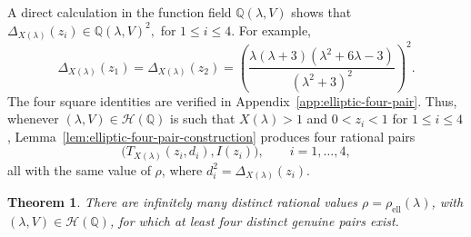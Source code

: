 \documentclass[11pt]{amsart}
\theoremstyle{plain}
\newtheorem{thm}{Theorem}[section]
\theoremstyle{remark}
\theoremstyle{plain}
\newcommand{\Q}{\mathbb{Q}}
\begin{document}
A direct calculation in the function field
$\Q(\lambda,V)$
shows that
$\Delta_{X(\lambda)}(z_i)\in\Q(\lambda,V)^2,$
for $1\leq i\leq4$.
For example,
\[
\Delta_{X(\lambda)}(z_1)
=
\Delta_{X(\lambda)}(z_2)
=
\left(
\frac{\lambda(\lambda+3)(\lambda^2+6\lambda-3)}
     {(\lambda^2+3)^2}
\right)^2.
\]
The four square identities are verified in
Appendix~\ref{app:elliptic-four-pair}. Thus, whenever $(\lambda,V)\in \mathcal H(\Q)$ is such that $X(\lambda)>1$ and
$0<z_i<1$ for $1\le i\le4$, Lemma~\ref{lem:elliptic-four-pair-construction} produces four rational pairs
\[
\bigl(T_{X(\lambda)}(z_i,d_i),I(z_i)\bigr),
\qquad i=1,\ldots,4,
\]
all with the same value of $\rho$, where $d_i^2=\Delta_{X(\lambda)}(z_i)$.

\begin{thm}\label{thm:four-pair-elliptic}
There are infinitely many distinct rational values
$\rho=\rho_{\mathrm{ell}}(\lambda)$, with
$(\lambda,V)\in\mathcal H(\Q)$, for which at least four distinct
genuine pairs exist.
\end{thm}
\end{document}
